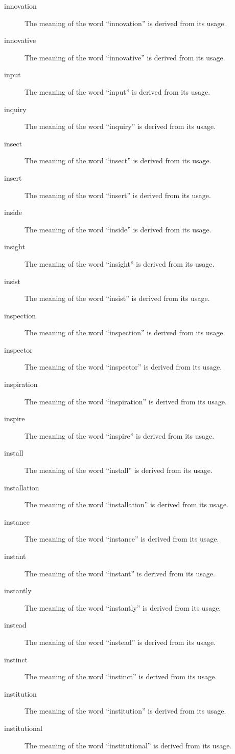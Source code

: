 \documentclass[12pt, letterpaper]{memoir}
\begin{document}
\begin{description}
\item[innovation] The meaning of the word ``innovation'' is derived from its usage.
\item[innovative] The meaning of the word ``innovative'' is derived from its usage.
\item[input] The meaning of the word ``input'' is derived from its usage.
\item[inquiry] The meaning of the word ``inquiry'' is derived from its usage.
\item[insect] The meaning of the word ``insect'' is derived from its usage.
\item[insert] The meaning of the word ``insert'' is derived from its usage.
\item[inside] The meaning of the word ``inside'' is derived from its usage.
\item[insight] The meaning of the word ``insight'' is derived from its usage.
\item[insist] The meaning of the word ``insist'' is derived from its usage.
\item[inspection] The meaning of the word ``inspection'' is derived from its usage.
\item[inspector] The meaning of the word ``inspector'' is derived from its usage.
\item[inspiration] The meaning of the word ``inspiration'' is derived from its usage.
\item[inspire] The meaning of the word ``inspire'' is derived from its usage.
\item[install] The meaning of the word ``install'' is derived from its usage.
\item[installation] The meaning of the word ``installation'' is derived from its usage.
\item[instance] The meaning of the word ``instance'' is derived from its usage.
\item[instant] The meaning of the word ``instant'' is derived from its usage.
\item[instantly] The meaning of the word ``instantly'' is derived from its usage.
\item[instead] The meaning of the word ``instead'' is derived from its usage.
\item[instinct] The meaning of the word ``instinct'' is derived from its usage.
\item[institution] The meaning of the word ``institution'' is derived from its usage.
\item[institutional] The meaning of the word ``institutional'' is derived from its usage.

\end{description}
\end{document}
